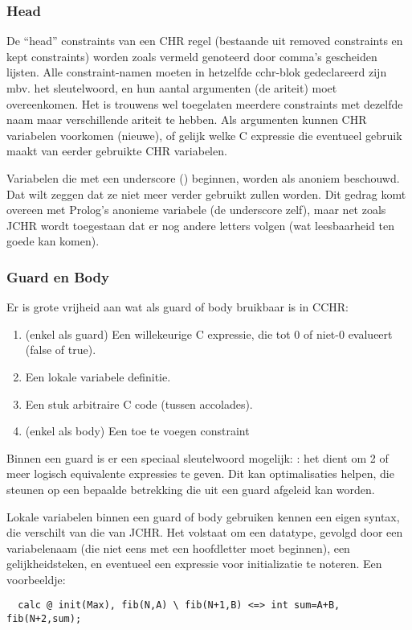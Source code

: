 \subsubsection{Head}

De ``head'' constraints van een CHR regel (bestaande uit removed constraints en kept constraints) worden zoals vermeld genoteerd door comma's gescheiden lijsten. Alle constraint-namen moeten in hetzelfde cchr-blok gedeclareerd zijn mbv. het  sleutelwoord, en hun aantal argumenten (de ariteit) moet overeenkomen. Het is trouwens wel toegelaten meerdere constraints met dezelfde naam maar verschillende ariteit te hebben. Als argumenten kunnen CHR variabelen voorkomen (nieuwe), of gelijk welke C expressie die eventueel gebruik maakt van eerder gebruikte CHR variabelen. 

Variabelen die met een underscore (\code{\_}) beginnen, worden als anoniem beschouwd. Dat wilt zeggen dat ze niet meer verder gebruikt zullen worden. Dit gedrag komt overeen met Prolog's anonieme variabele (de underscore zelf), maar net zoals JCHR wordt toegestaan dat er nog andere letters volgen (wat leesbaarheid ten goede kan komen).

\subsubsection{Guard en Body}

Er is grote vrijheid aan wat als guard of body bruikbaar is in CCHR: \begin{enumerate}
  \item (enkel als guard) Een willekeurige C expressie, die tot 0 of niet-0 evalueert (false of true).
  \item Een lokale variabele definitie.
  \item Een stuk arbitraire C code (tussen accolades).
  \item (enkel als body) Een toe te voegen constraint
\end{enumerate}

Binnen een guard is er een speciaal sleutelwoord mogelijk: : het dient om 2 of meer logisch equivalente expressies te geven. Dit kan optimalisaties helpen, die steunen op een bepaalde betrekking die uit een guard afgeleid kan worden.

Lokale variabelen binnen een guard of body gebruiken kennen een eigen syntax, die verschilt van die van JCHR. Het volstaat om een datatype, gevolgd door een variabelenaam (die niet eens met een hoofdletter moet beginnen), een gelijkheidsteken, en eventueel een expressie voor initializatie te noteren. Een voorbeeldje: \begin{Verbatim}
  calc @ init(Max), fib(N,A) \ fib(N+1,B) <=> int sum=A+B, fib(N+2,sum);
\end{Verbatim}

